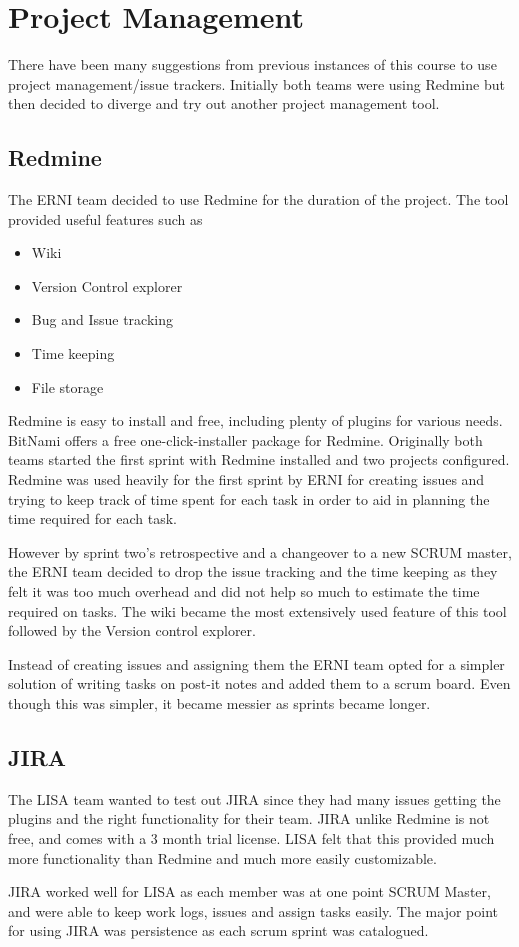 \section{Project Management}

There have been many suggestions from previous instances of this course to use project management/issue trackers. Initially both teams were using Redmine but then decided to diverge and try out another project management tool. 

\subsection{Redmine}

The ERNI team decided to use Redmine for the duration of the project. The tool provided useful features such as
\begin{itemize}
\item Wiki
\item Version Control explorer
\item Bug and Issue tracking
\item Time keeping
\item File storage
\end{itemize} 

Redmine is easy to install and free, including plenty of plugins for various needs. BitNami offers a free one-click-installer package for Redmine. Originally both teams started the first sprint with Redmine installed and two projects configured. Redmine was used heavily for the first sprint by ERNI for creating issues and trying to keep track of time spent for each task in order to aid in planning the time required for each task. 

However by sprint two's retrospective and a changeover to a new SCRUM master, the ERNI team decided to drop the issue tracking and the time keeping as they felt it was too much overhead and did not help so much to estimate the time required on tasks. The wiki became the most extensively used feature of this tool followed by the Version control explorer. 

Instead of creating issues and assigning them the ERNI team opted for a simpler solution of writing tasks on post-it notes and added them to a scrum board. Even though this was simpler, it became messier as sprints became longer.

\subsection{JIRA}

The LISA team wanted to test out JIRA since they had many issues getting the plugins and the right functionality for their team. JIRA unlike Redmine is not free, and comes with a 3 month trial license. LISA felt that this provided much more functionality than Redmine and much more easily customizable.

JIRA worked well for LISA as each member was at one point SCRUM Master, and were able to keep work logs, issues and assign tasks easily. The major point for using JIRA was persistence as each scrum sprint was catalogued.
